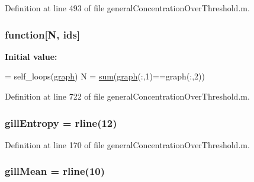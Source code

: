 Definition at line 493 of file general\-Concentration\-Over\-Threshold.\-m.

\hypertarget{a00028_af12e4ac3392d0671e386d46e2424a06a}{
\subsubsection[{function}]{ function\mbox{[}N, {\bf ids}\mbox{]}}}\label{a00028_af12e4ac3392d0671e386d46e2424a06a}
{\bfseries Initial value\-:}
\begin{DoxyCode}
= self\_loops(\hyperlink{a00028_a91819eaefb434ac459f17b3caa03713d}{graph})
    N = \hyperlink{a00028_a576bebae86b11914280920c448def53d}{sum}(\hyperlink{a00028_a91819eaefb434ac459f17b3caa03713d}{graph}(:,1)==graph(:,2))
\end{DoxyCode}


Definition at line 722 of file general\-Concentration\-Over\-Threshold.\-m.

\hypertarget{a00028_aef2e92fdea881fe7819bf51b2d7e0783}{
\subsubsection[{gill\-Entropy}]{\setlength{\rightskip}{0pt plus 5cm}gill\-Entropy = {\bf rline}(12)}}\label{a00028_aef2e92fdea881fe7819bf51b2d7e0783}


Definition at line 170 of file general\-Concentration\-Over\-Threshold.\-m.

\hypertarget{a00028_a7d36858faf2f8bb5963306c86db2b549}{
\subsubsection[{gill\-Mean}]{\setlength{\rightskip}{0pt plus 5cm}gill\-Mean = {\bf rline}(10)}}\label{a00028_a7d36858faf2f8bb5963306c86db2b549}


